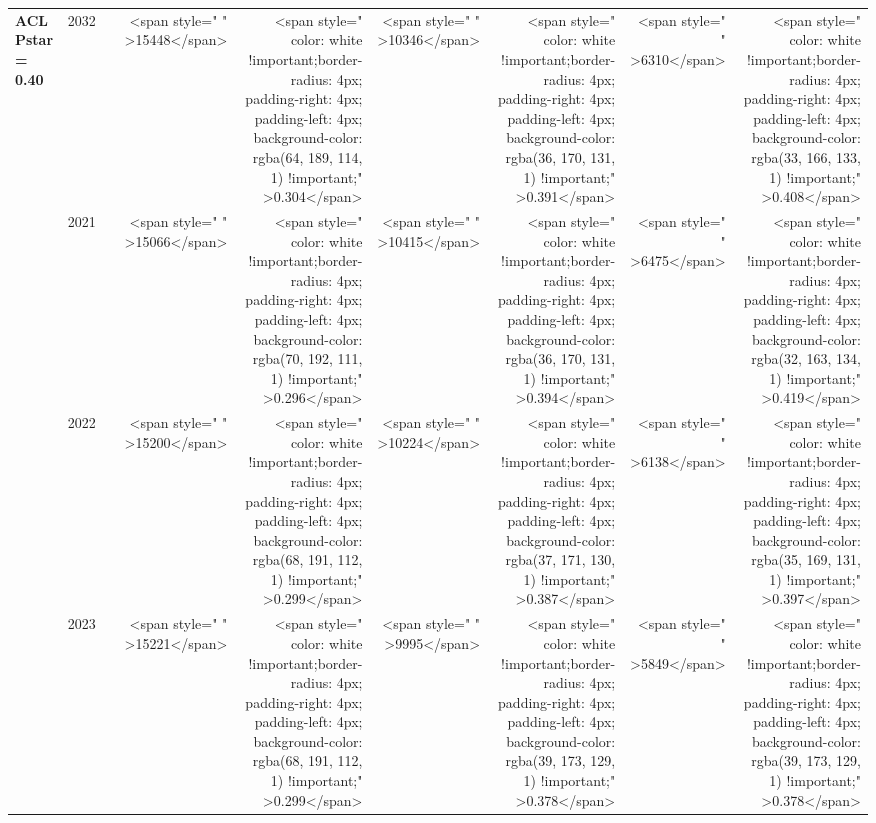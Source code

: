 \begin{table}
\begin{tabular}[t]{>{}l|l>{}rr>{}r|rrrr}
\multirow{-12}{*}{\raggedright\arraybackslash \textbf{ACL Pstar = 0.40}} & 2032 & \cellcolor[HTML]{8A8779}{\textcolor{white}{692}} & <span style="     " >15448</span> & <span style="     color: white !important;border-radius: 4px; padding-right: 4px; padding-left: 4px; background-color: rgba(64, 189, 114, 1) !important;" >0.304</span> & <span style="     " >10346</span> & <span style="     color: white !important;border-radius: 4px; padding-right: 4px; padding-left: 4px; background-color: rgba(36, 170, 131, 1) !important;" >0.391</span> & <span style="     " >6310</span> & <span style="     color: white !important;border-radius: 4px; padding-right: 4px; padding-left: 4px; background-color: rgba(33, 166, 133, 1) !important;" >0.408</span>\\
\cmidrule{1-9}
 & 2021 & \cellcolor[HTML]{858379}{\textcolor{white}{700}} & <span style="     " >15066</span> & <span style="     color: white !important;border-radius: 4px; padding-right: 4px; padding-left: 4px; background-color: rgba(70, 192, 111, 1) !important;" >0.296</span> & <span style="     " >10415</span> & <span style="     color: white !important;border-radius: 4px; padding-right: 4px; padding-left: 4px; background-color: rgba(36, 170, 131, 1) !important;" >0.394</span> & <span style="     " >6475</span> & <span style="     color: white !important;border-radius: 4px; padding-right: 4px; padding-left: 4px; background-color: rgba(32, 163, 134, 1) !important;" >0.419</span>\\

 & 2022 & \cellcolor[HTML]{858379}{\textcolor{white}{700}} & <span style="     " >15200</span> & <span style="     color: white !important;border-radius: 4px; padding-right: 4px; padding-left: 4px; background-color: rgba(68, 191, 112, 1) !important;" >0.299</span> & <span style="     " >10224</span> & <span style="     color: white !important;border-radius: 4px; padding-right: 4px; padding-left: 4px; background-color: rgba(37, 171, 130, 1) !important;" >0.387</span> & <span style="     " >6138</span> & <span style="     color: white !important;border-radius: 4px; padding-right: 4px; padding-left: 4px; background-color: rgba(35, 169, 131, 1) !important;" >0.397</span>\\

 & 2023 & \cellcolor[HTML]{777776}{\textcolor{white}{726}} & <span style="     " >15221</span> & <span style="     color: white !important;border-radius: 4px; padding-right: 4px; padding-left: 4px; background-color: rgba(68, 191, 112, 1) !important;" >0.299</span> & <span style="     " >9995</span> & <span style="     color: white !important;border-radius: 4px; padding-right: 4px; padding-left: 4px; background-color: rgba(39, 173, 129, 1) !important;" >0.378</span> & <span style="     " >5849</span> & <span style="     color: white !important;border-radius: 4px; padding-right: 4px; padding-left: 4px; background-color: rgba(39, 173, 129, 1) !important;" >0.378</span>\\


\end{tabular}
\end{table}
